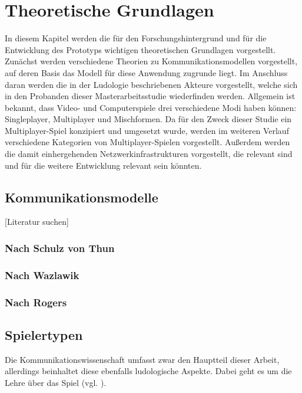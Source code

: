 \chapter{Theoretische Grundlagen}

In diesem Kapitel werden die für den Forschungshintergrund und für die Entwicklung des Prototyps wichtigen theoretischen Grundlagen vorgestellt.
Zunächst werden verschiedene Theorien zu Kommunikationsmodellen vorgestellt, auf deren Basis das Modell für diese Anwendung zugrunde liegt.
Im Anschluss daran werden die in der Ludologie beschriebenen Akteure vorgestellt, welche sich in den Probanden dieser Masterarbeitsstudie wiederfinden werden. Allgemein ist bekannt, dass Video- und Computerspiele drei verschiedene Modi haben können: Singleplayer, Multiplayer und Mischformen. Da für den Zweck dieser Studie ein Multiplayer-Spiel konzipiert und umgesetzt wurde, werden im weiteren Verlauf verschiedene Kategorien von Multiplayer-Spielen vorgestellt. Außerdem werden die damit einhergehenden Netzwerkinfrastrukturen vorgestellt, die relevant sind und für die weitere Entwicklung relevant sein könnten.

\section{Kommunikationsmodelle}
[Literatur suchen]

\subsection{Nach Schulz von Thun}
\subsection{Nach Wazlawik}
\subsection{Nach Rogers}


\section{Spielertypen}
Die Kommunikationswissenschaft umfasst zwar den Hauptteil dieser Arbeit, allerdings beinhaltet diese ebenfalls ludologische Aspekte. Dabei geht es um die Lehre über das Spiel (vgl. \cite{ludologie_spielforschung_nodate}). 


